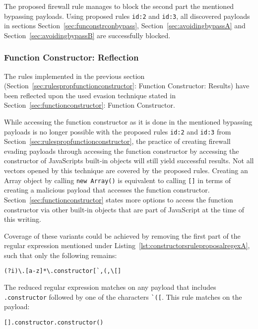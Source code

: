 The proposed firewall rule manages to block the second part the mentioned bypassing payloads. Using proposed rules \verb|id:2| and \verb|id:3|, all discovered payloads in sections Section~\ref{sec:funconstrconbypass}, Section~\ref{sec:avoidingbypassA} and Section~\ref{sec:avoidingbypassB} are successfully blocked.



\subsubsection{Function Constructor: Reflection}
The rules implemented in the previous section (Section~\ref{sec:rulespropfunctionconstructor}: Function Constructor: Results) have been reflected upon the used evasion technique stated in Section~\ref{sec:functionconstructor}: Function Constructor.

While accessing the function constructor as it is done in the mentioned bypassing payloads is no longer possible with the proposed rules \verb|id:2| and \verb|id:3| from Section~\ref{sec:rulespropfunctionconstructor}, the practice of creating firewall evading payloads through accessing the function constructor by accessing the constructor of JavaScripts built-in objects will still yield successful results. Not all vectors opened by this technique are covered by the proposed rules. Creating an Array object by calling \verb|new Array()| is equivalent to calling \verb|[]| in terms of creating a malicious payload that accesses the function constructor. Section~\ref{sec:functionconstructor} states more options to access the function constructor via other built-in objects that are part of JavaScript at the time of this writing.

Coverage of these variants could be achieved by removing the first part of the regular expression mentioned under Listing~\ref{lst:constructorsruleproposalregexA}, such that only the following remains:

\begin{lstlisting}[style=basicStyle, caption=reduced regex of proposed rule id:2, label={lst:constructorsruleproposalregexB}]
(?i)\.[a-z]*\.constructor[`,(,\[]
\end{lstlisting}

The reduced regular expression matches on any payload that includes \verb|.constructor| followed by one of the characters \verb|`([|. This rule matches on the payload:

\begin{lstlisting}[style=basicStyle]
[].constructor.constructor()
\end{lstlisting}

